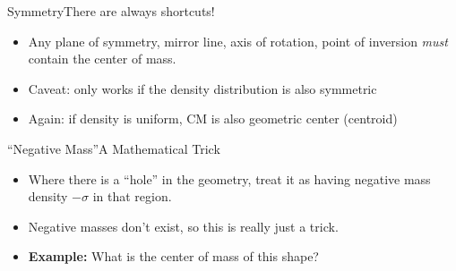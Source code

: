 \documentclass[12pt,compress,aspectratio=169]{beamer}
\begin{document}
\begin{frame}{Symmetry}{There are always shortcuts!}
  \begin{itemize}
  \item Any plane of symmetry, mirror line, axis of rotation, point of inversion
    \emph{must} contain the center of mass.
  \item Caveat: only works if the density distribution is also symmetric
  \item Again: if density is uniform, CM is also geometric center (centroid)
  \end{itemize}
\end{frame}



\begin{frame}{``Negative Mass''}{A Mathematical Trick}
  \begin{itemize}
  \item Where there is a ``hole'' in the geometry, treat it as having negative
    mass density $-\sigma$ in that region.
  \item Negative masses don't exist, so this is really just a trick.
  \item\textbf{Example:} What is the center of mass of this shape?
    \begin{center}
    \end{center}
  \end{itemize}
\end{frame}
\end{document}
